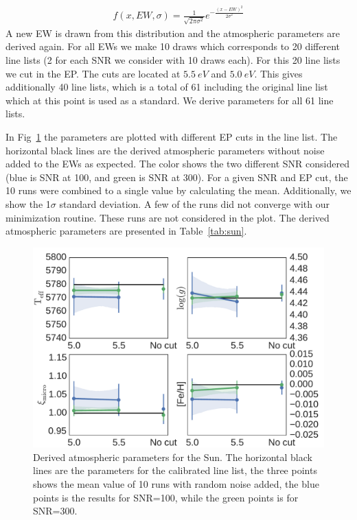 \documentclass{aa}
\begin{document}
\begin{align}
    f(x, EW, \sigma) = \frac{1}{\sqrt{2\pi\sigma^2}} e^{-\frac{(x-EW)^2}{2\sigma^2}}
\end{align}
A new EW is drawn from this distribution and the atmospheric parameters
are derived again. For all EWs we make 10 draws which corresponds to
20 different line lists (2 for each SNR we consider with 10 draws
each). For this 20 line lists we cut in the EP. The cuts are located
at $\SI{5.5}{eV}$ and $\SI{5.0}{eV}$. This gives additionally 40 line
lists, which is a total of 61 including the original line list which at
this point is used as a standard. We derive parameters for all 61 line
lists.


In Fig~\ref{fig:solar_parameters} the parameters are plotted with
different EP cuts in the line list. The horizontal black lines are
the derived atmospheric parameters without noise added to the EWs as
expected. The color shows the two different SNR considered (blue is
SNR at 100, and green is SNR at 300). For a given SNR and EP cut,
the 10 runs were combined to a single value by calculating the mean.
Additionally, we show the 1$\sigma$ standard deviation. A few of the
runs did not converge with our minimization routine. These runs are not
considered in the plot. The derived atmospheric parameters are presented
in Table~\ref{tab:sun}.

\begin{figure}[t!]
    \centering
    \includegraphics[width=1.0\linewidth]{figures/solar_parameters_10runs.pdf}
    \caption{Derived atmospheric parameters for the Sun. The horizontal
    black lines are the parameters for the calibrated line list, the
    three points shows the mean value of 10 runs with random noise
    added, the blue points is the results for SNR=100, while the
    green points is for SNR=300.}
    \label{fig:solar_parameters}
\end{figure}
\end{document}
